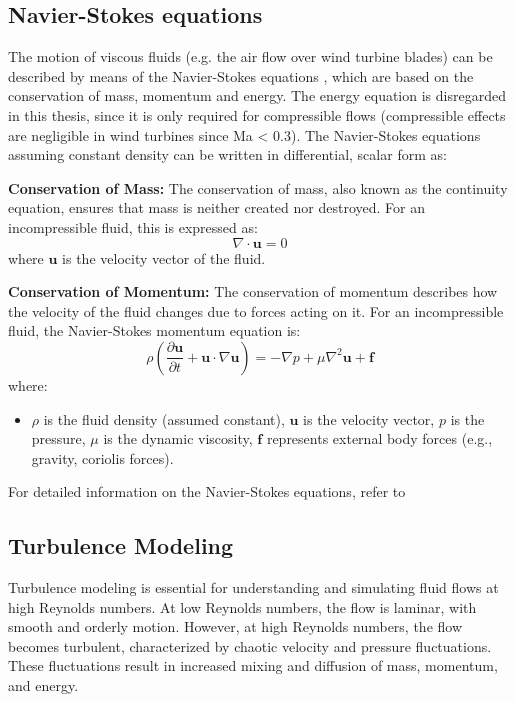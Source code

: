\subsection{Navier-Stokes equations}
The motion of viscous fluids (e.g. the air flow over wind turbine blades) can be described by
means of the Navier-Stokes equations \cite{NSeqn}, which are based on the conservation of mass, momentum
and energy. The energy equation is disregarded in this thesis, since it is only required for
compressible flows (compressible effects are negligible in wind turbines since Ma < 0.3). The
Navier-Stokes equations assuming constant density can be written in differential, scalar form
as:
\begin{definition} \label{def:NSeqn}
    \textbf{Conservation of Mass:}
    The conservation of mass, also known as the continuity equation, ensures that mass is neither
    created nor destroyed. For an incompressible fluid, this is expressed as:
    \begin{equation}
    \nabla \cdot \mathbf{u} = 0
    \end{equation}
    where $\mathbf{u}$ is the velocity vector of the fluid.
    
    \textbf{Conservation of Momentum:}
    The conservation of momentum describes how the velocity of the fluid changes due to forces acting on it. For an incompressible fluid, the Navier-Stokes momentum equation is:
    \begin{equation}
    \rho \left( \frac{\partial \mathbf{u}}{\partial t} + \mathbf{u} \cdot \nabla \mathbf{u} \right) = -\nabla p + \mu \nabla^2 \mathbf{u} + \mathbf{f}
    \end{equation}
    where:
    \begin{itemize}
        \item $\rho$ is the fluid density (assumed constant), $\mathbf{u}$ is the velocity vector, $p$ is the pressure, $\mu$ is the dynamic viscosity, $\mathbf{f}$ represents external body forces (e.g., gravity, coriolis forces).
    \end{itemize}
    For detailed information on the Navier-Stokes equations, refer to \cite{NSeqn}
\end{definition}



\subsection{Turbulence Modeling}

Turbulence modeling is essential for understanding and simulating fluid flows at high Reynolds numbers. At low Reynolds numbers, the flow is laminar, with smooth and orderly motion. However, at high Reynolds numbers, the flow becomes turbulent, characterized by chaotic velocity and pressure fluctuations. These fluctuations result in increased mixing and diffusion of mass, momentum, and energy.


